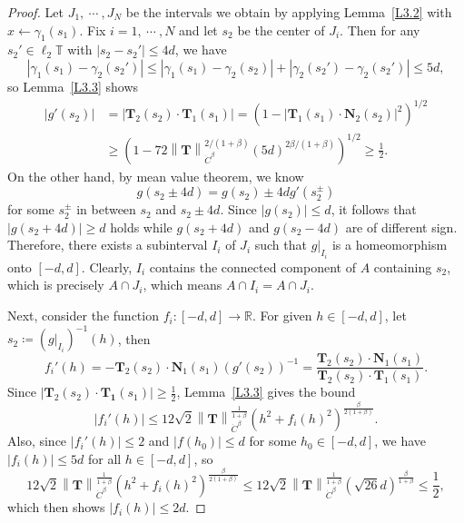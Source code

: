 \documentclass[reqno,centertags,12pt]{amsart}
\theoremstyle{definition}
\numberwithin{equation}{section}
\newcommand{\abs}[1]{\left\lvert#1\right\rvert}
\newcommand{\norm}[1]{\left\|#1\right\|}
\newcommand{\bbR}{{\mathbb{R}}}
\newcommand{\bbT}{{\mathbb{T}}}
\begin{document}
\begin{proof}
    Let $J_{1},\ \cdots\ ,J_{N}$ be the intervals we obtain by applying
    Lemma~\ref{L3.2} with $x\leftarrow \gamma_{1}(s_{1})$.
    Fix $i=1,\ \cdots\ ,N$ and let $s_{2}$ be the center of $J_{i}$.
    Then for any $s_{2}'\in\ell_{2}\bbT$ with $\abs{s_{2}-s_{2}'}\leq 4d$, we have
    \[
        \abs{\gamma_{1}(s_{1}) - \gamma_{2}(s_{2}')}
        \leq \abs{\gamma_{1}(s_{1}) - \gamma_{2}(s_{2})}
        + \abs{\gamma_{2}(s_{2}') - \gamma_{2}(s_{2}')} \leq 5d,
    \]
    so Lemma~\ref{L3.3} shows
    \begin{align*}
        \abs{g'(s_{2})} &= \abs{\mathbf{T}_{2}(s_{2})\cdot\mathbf{T}_{1}(s_{1})}
        = \left(1 - \abs{\mathbf{T}_{1}(s_{1})\cdot\mathbf{N}_{2}(s_{2})}^{2}\right)^{1/2} \\
        &\geq \left(1 - 72\norm{\mathbf{T}}_{\dot{C}^{\beta}}^{2/(1+\beta)}
        (5d)^{2\beta/(1+\beta)}\right)^{1/2} \geq \frac{1}{2}.
    \end{align*}
    On the other hand, by mean value theorem, we know
    \[
        g(s_{2} \pm 4d) = g(s_{2}) \pm 4dg'(s_{2}^{\pm})
    \]
    for some $s_{2}^{\pm}$ in between $s_{2}$ and $s_{2}\pm 4d$. Since $\abs{g(s_{2})}\leq d$,
    it follows that $\abs{g(s_{2}+4d)}\geq d$ holds while $g(s_{2}+4d)$ and
    $g(s_{2}-4d)$ are of different sign. Therefore, there exists a subinterval
    $I_{i}$ of $J_{i}$ such that $g|_{I_{i}}$ is a homeomorphism onto $[-d,d]$.
    Clearly, $I_{i}$ contains the connected component of $A$ containing $s_{2}$,
    which is precisely $A\cap J_{i}$, which means $A\cap I_{i} = A\cap J_{i}$.

    Next, consider the function $f_{i}\colon [-d,d]\to\bbR$. For given $h\in[-d,d]$,
    let $s_{2}\coloneqq (g|_{I_{i}})^{-1}(h)$, then
    \[
        f_{i}'(h) = -\mathbf{T}_{2}(s_{2})\cdot\mathbf{N}_{1}(s_{1})
        \left(g'(s_{2})\right)^{-1}
        = \frac{\mathbf{T}_{2}(s_{2})\cdot\mathbf{N}_{1}(s_{1})}
        {\mathbf{T}_{2}(s_{2})\cdot\mathbf{T}_{1}(s_{1})}.
    \]
    Since $\abs{\mathbf{T}_{2}(s_{2})\cdot\mathbf{T_{1}}(s_{1})}\geq\frac{1}{2}$,
    Lemma~\ref{L3.3} gives the bound
    \[
        \abs{f_{i}'(h)} \leq
        12\sqrt{2}\norm{\mathbf{T}}_{\dot{C}^{\beta}}^{\frac{1}{1+\beta}}
        (h^{2}+f_{i}(h)^{2})^{\frac{\beta}{2(1+\beta)}}.
    \]
    Also, since $\abs{f_{i}'(h)}\leq 2$ and $\abs{f(h_{0})}\leq d$ for some $h_{0}\in[-d,d]$,
    we have $\abs{f_{i}(h)}\leq 5d$ for all $h\in[-d,d]$, so
    \[
        12\sqrt{2}\norm{\mathbf{T}}_{\dot{C}^{\beta}}^{\frac{1}{1+\beta}}
        (h^{2}+f_{i}(h)^{2})^{\frac{\beta}{2(1+\beta)}}
        \leq 12\sqrt{2}\norm{\mathbf{T}}_{\dot{C}^{\beta}}^{\frac{1}{1+\beta}}
        \left(\sqrt{26}d\right)^{\frac{\beta}{1+\beta}}\leq\frac{1}{2},
    \]
    which then shows $\abs{f_{i}(h)}\leq 2d$.


\end{proof}
\end{document}
